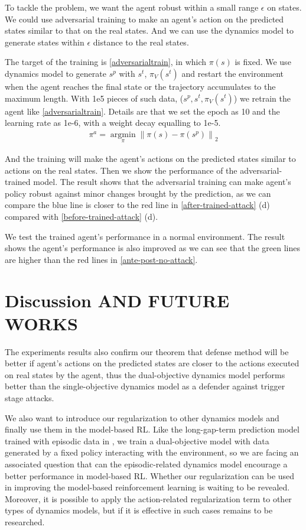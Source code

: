 \documentclass[letterpaper, 10 pt, conference]{ieeeconf}  %
\begin{document}
To tackle the problem, we want the agent robust within a small range $\epsilon$ on states. We could use adversarial training to make an agent's action on the predicted states similar to that on the real states. And we can use the dynamics model to generate states within $\epsilon$ distance to the real states.

The target of the training is \ref{adversarialtrain}, in which $\pi\left(s\right)$ is fixed. We use dynamics model to generate $s^p$ with $s^t$, $\pi_V(s^t)$ and restart the environment when the agent reaches the final state or the trajectory accumulates to the maximum length. With 1e5 pieces of such data, ($s^p,s^t,\pi_V(s^t)$) we retrain the agent like \ref{adversarialtrain}. Details are that we set the epoch as 10 and the learning rate as 1e-6, with a weight decay equalling to 1e-5.
\begin{eqnarray}
\label{adversarialtrain}
\pi^a=\underset{\pi}{\operatorname{argmin}}\left\|\pi(s)-\pi\left(s^p\right)\right\|_2
\end{eqnarray}

And the training will make the agent's actions on the predicted states similar to actions on the real states. Then we show the performance of the adversarial-trained model. The result shows that the adversarial training can make agent's policy robust against minor changes brought by the prediction, as we can compare the blue line is closer to the red line in \ref{after-trained-attack} (d) compared with \ref{before-trained-attack} (d). 

We test the trained agent's performance in a normal environment. The result shows the agent’s performance is also improved as we can see that the green lines are higher than the red lines in \ref{ante-post-no-attack}.

\fi
\section{Discussion AND FUTURE WORKS}
The experiments results also confirm our theorem that defense method will be better if agent's actions on the predicted states are closer to the actions executed on real states by the agent, thus the dual-objective dynamics model performs better than the single-objective dynamics model as a defender against trigger stage attacks. 

We also want to introduce our regularization to other dynamics models and finally use them in the model-based RL. Like the long-gap-term prediction model trained with episodic data in \cite{lambert2021learning}, we train a dual-objective model with data generated by a fixed policy interacting with the environment, so we are facing an associated question that can the episodic-related dynamics model encourage a better performance in model-based RL. Whether our regularization can be used in improving the model-based reinforcement learning is waiting to be revealed. Moreover, it is possible to apply the action-related regularization term to other types of dynamics models, but if it is effective in such cases remains to be researched.
\end{document}

